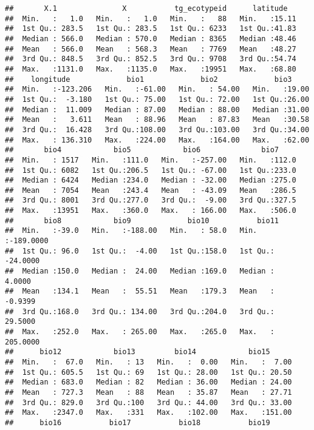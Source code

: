 \documentclass[]{article}
\begin{document}
\begin{verbatim}
##       X.1               X           tg_ecotypeid      latitude    
##  Min.   :   1.0   Min.   :   1.0   Min.   :   88   Min.   :15.11  
##  1st Qu.: 283.5   1st Qu.: 283.5   1st Qu.: 6233   1st Qu.:41.83  
##  Median : 566.0   Median : 570.0   Median : 8365   Median :48.46  
##  Mean   : 566.0   Mean   : 568.3   Mean   : 7769   Mean   :48.27  
##  3rd Qu.: 848.5   3rd Qu.: 852.5   3rd Qu.: 9708   3rd Qu.:54.74  
##  Max.   :1131.0   Max.   :1135.0   Max.   :19951   Max.   :68.80  
##    longitude             bio1             bio2             bio3      
##  Min.   :-123.206   Min.   :-61.00   Min.   : 54.00   Min.   :19.00  
##  1st Qu.:  -3.180   1st Qu.: 75.00   1st Qu.: 72.00   1st Qu.:26.00  
##  Median :  11.009   Median : 87.00   Median : 88.00   Median :31.00  
##  Mean   :   3.611   Mean   : 88.96   Mean   : 87.83   Mean   :30.58  
##  3rd Qu.:  16.428   3rd Qu.:108.00   3rd Qu.:103.00   3rd Qu.:34.00  
##  Max.   : 136.310   Max.   :224.00   Max.   :164.00   Max.   :62.00  
##       bio4            bio5            bio6              bio7      
##  Min.   : 1517   Min.   :111.0   Min.   :-257.00   Min.   :112.0  
##  1st Qu.: 6082   1st Qu.:206.5   1st Qu.: -67.00   1st Qu.:233.0  
##  Median : 6424   Median :234.0   Median : -32.00   Median :275.0  
##  Mean   : 7054   Mean   :243.4   Mean   : -43.09   Mean   :286.5  
##  3rd Qu.: 8001   3rd Qu.:277.0   3rd Qu.:  -9.00   3rd Qu.:327.5  
##  Max.   :13951   Max.   :360.0   Max.   : 166.00   Max.   :506.0  
##       bio8            bio9             bio10           bio11          
##  Min.   :-39.0   Min.   :-188.00   Min.   : 58.0   Min.   :-189.0000  
##  1st Qu.: 96.0   1st Qu.:  -4.00   1st Qu.:158.0   1st Qu.: -24.0000  
##  Median :150.0   Median :  24.00   Median :169.0   Median :   4.0000  
##  Mean   :134.1   Mean   :  55.51   Mean   :179.3   Mean   :  -0.9399  
##  3rd Qu.:168.0   3rd Qu.: 134.00   3rd Qu.:204.0   3rd Qu.:  29.5000  
##  Max.   :252.0   Max.   : 265.00   Max.   :265.0   Max.   : 205.0000  
##      bio12            bio13         bio14            bio15       
##  Min.   :  67.0   Min.   : 13   Min.   :  0.00   Min.   :  7.00  
##  1st Qu.: 605.5   1st Qu.: 69   1st Qu.: 28.00   1st Qu.: 20.50  
##  Median : 683.0   Median : 82   Median : 36.00   Median : 24.00  
##  Mean   : 727.3   Mean   : 88   Mean   : 35.87   Mean   : 27.71  
##  3rd Qu.: 829.0   3rd Qu.:100   3rd Qu.: 44.00   3rd Qu.: 33.00  
##  Max.   :2347.0   Max.   :331   Max.   :102.00   Max.   :151.00  
##      bio16           bio17           bio18           bio19      

\end{verbatim}
\end{document}
